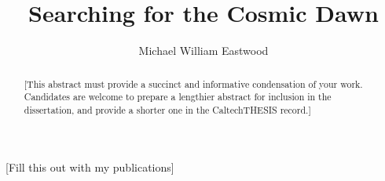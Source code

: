 \documentclass[12pt]{caltech_thesis}
\begin{document}
\title{Searching for the Cosmic Dawn}
\author{Michael William Eastwood}

\address{Pasadena, California}                     %



\maketitle[logo]

\begin{acknowledgements}
\end{acknowledgements}

\begin{abstract}
    [This abstract must provide a succinct and informative condensation of your work. Candidates are welcome to prepare a lengthier abstract for inclusion in the dissertation, and provide a shorter one in the CaltechTHESIS record.]
\end{abstract}


[Fill this out with my publications]

\tableofcontents
\listoffigures
\listoftables

\mainmatter







\appendix

\end{document}

